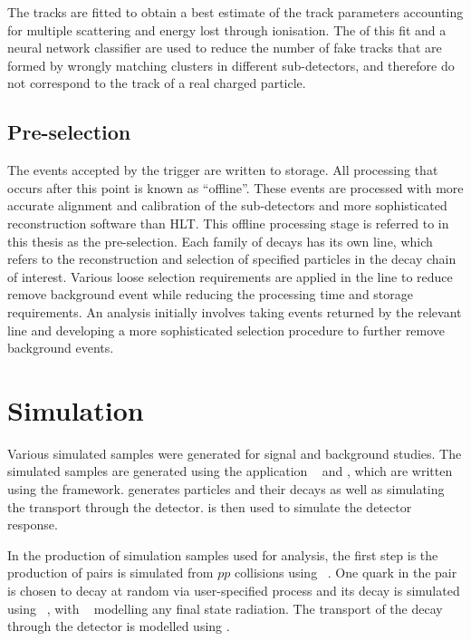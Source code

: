 The tracks are fitted to obtain a best estimate of the track parameters accounting for multiple scattering and energy lost through ionisation. The \chisq of this fit and a neural network classifier are used to reduce the number of fake tracks that are formed by wrongly matching clusters in different sub-detectors, and therefore do not correspond to the track of a real charged particle.

\subsection{Pre-selection}
\label{sec:detector:stripping}

The events accepted by the trigger are written to storage. All processing that occurs after this point is known as ``offline''. These events are processed with more accurate alignment and calibration of the sub-detectors and more sophisticated reconstruction software than HLT. This offline processing stage is referred to in this thesis as the pre-selection. Each family of decays has its own line, which refers to the reconstruction and selection of specified particles in the decay chain of interest. Various loose selection requirements are applied in the line to reduce remove background event while reducing the processing time and storage requirements. An analysis initially involves taking events returned by the relevant line and developing a more sophisticated selection procedure to further remove background events.

\section{Simulation}

Various simulated samples were generated for signal and background studies. The simulated samples are generated using the \lhcb application \gauss~\cite{LHCb-PROC-2011-006} and \boole, which are written using the \gaudi framework. \gauss generates particles and their decays as well as simulating the transport through the detector. \boole is then used to simulate the detector response. 

In the production of simulation samples used for analysis, the first step is the production of \bquark\bquarkbar pairs is simulated from $pp$ collisions using \pythia~\cite{Sjostrand:2007gs}. One quark in the \bquark\bquarkbar pair is chosen to decay at random via user-specified process and its decay is simulated using \evtgen~\cite{Lange:2001uf}, with \photos~\cite{Golonka:2005pn} modelling any final state radiation. The transport of the decay through the detector is modelled using \geant. 

